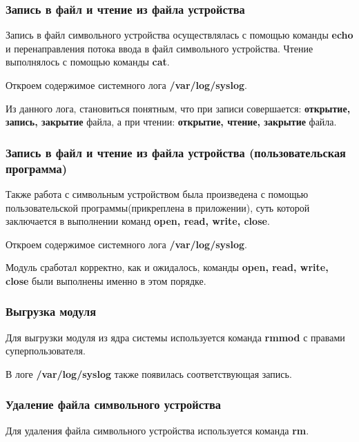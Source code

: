 \subsubsection{Запись в файл и чтение из файла устройства}
Запись в файл символьного устройства осуществлялась с помощью команды \textbf{echo} и перенаправления потока ввода в файл символьного устройства. Чтение выполнялось с помощью команды \textbf{cat}. 


Откроем содержимое системного лога \textbf{/var/log/syslog}.

Из данного лога, становиться понятным, что при записи совершается: \textbf{открытие, запись, закрытие} файла, а при чтении: \textbf{открытие, чтение, закрытие} файла.


\subsubsection{Запись в файл и чтение из файла устройства (пользовательская программа)}
Также работа с символьным устройством была произведена с помощью пользовательской программы(прикреплена в приложении), суть которой заключается в выполнении команд \textbf{open, read, write, close}.

Откроем содержимое системного лога \textbf{/var/log/syslog}.

Модуль сработал корректно, как и ожидалось, команды \textbf{open, read, write, close} были выполнены именно в этом порядке.


\subsubsection{Выгрузка модуля}
Для выгрузки модуля из ядра системы используется команда \textbf{rmmod} с правами суперпользователя.

В логе \textbf{/var/log/syslog} также появилась соответствующая запись.


\subsubsection{Удаление файла символьного устройства}
Для удаления файла символьного устройства используется команда \textbf{rm}.



